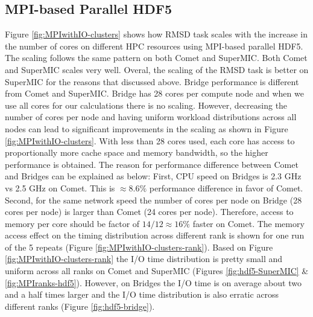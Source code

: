 \subsection{MPI-based Parallel HDF5}
Figure \ref{fig:MPIwithIO-clusters} shows how RMSD task scales with the increase in the number of cores on different HPC resources using MPI-based parallel HDF5.  
The scaling follows the same pattern on both Comet and SuperMIC. 
Both Comet and SuperMIC scales very well.
Overal, the scaling of the RMSD task is better on SuperMIC for the reasons that discussed above.
Bridge performance is different from Comet and SuperMIC.
Bridge has 28 cores per compute node and when we use all cores for our calculations there is no scaling.
However, decreasing the number of cores per node and having uniform workload distributions across all nodes can lead to significant improvements in the scaling as shown in Figure \ref{fig:MPIwithIO-clusters}.
With less than 28 cores used, each core has access to proportionally more cache space and memory bandwidth, so the higher performance is obtained. 
The reason for performance difference between Comet and Bridges can be explained as below:
First, CPU speed on Bridges is 2.3 GHz vs 2.5 GHz on Comet. This is $\approx 8.6\%$ performance difference in favor of Comet. 
Second, for the same network speed the number of cores per node on Bridge (28 cores per node) is larger than Comet (24 cores per node). 
Therefore, access to memory per core should be factor of $14/12 \approx 16\%$ faster on Comet.
The memory access effect on the timing distribution across different rank is shown for one run of the 5 repeats (Figure \ref{fig:MPIwithIO-clusters-rank}).
Based on Figure \ref{fig:MPIwithIO-clusters-rank} the I/O time distribution is pretty small and uniform across all ranks on Comet and SuperMIC (Figures \ref{fig:hdf5-SuperMIC} \& \ref{fig:MPIranks-hdf5}).
However, on Bridges the I/O time is on average about two and a half times larger and the I/O time distribution is also erratic across different ranks (Figure \ref{fig:hdf5-bridge}).  

